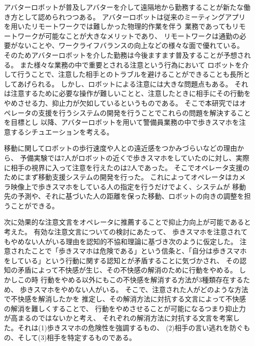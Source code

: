 \documentclass{kuisthesis}
\date{2024年1月31日}
\begin{document}
\maketitle

\begin{jabstract}


アバターロボットが普及しアバターを介して遠隔地から勤務することが新たな働き方として認められつつある。
アバターロボットは従来のミーティングアプリを用いたリモートワークでは難しかった物理的作業を伴う
業務であってもリモートワークが可能なことが大きなメリットであり、
リモートワークは通勤の必要がないことや、ワークライフバランスの向上などの様々な面で優れている。
そのためアバターロボットを介した勤務は今後ますます普及することが予想される。
また様々な業務の中で重要とされる注意という行為において
ロボットを介して行うことで、注意した相手とのトラブルを避けることができることも長所としてあげられる。
しかし、ロボットによる注意には大きな問題点もある。
それは注意するために必要な操作が難しいことと、注意したときに相手にその行動をやめさせる力、抑止力が欠如しているというものである。
そこで本研究ではオペレータの支援を行うシステムの開発を行うことでこれらの問題を解決することを目標とし
以降、アバターロボットを用いて警備員業務の中で歩きスマホを注意するシチュエーションを考える。

移動に関してロボットの歩行速度や人との遠近感をつかみづらいなどの理由から、
予備実験では7人がロボットの近くで歩きスマホをしていたのに対し、実際に相手の視界に入って注意を行えたのは2人であった。
そこでオペレータ支援のためにまず移動支援システムの開発を行った。
これによってオペレータはカメラ映像上で歩きスマホをしている人の指定を行うだけでよく、システムが
移動先の予測や、それに基づいた人の距離を保った移動、ロボットの向きの調整を担うことができる。

次に効果的な注意文言をオペレータに推薦することで抑止力向上が可能であると考えた。
有効な注意文言についての検討にあたって、
歩きスマホを注意されてもやめない人がいる理由を認知的不協和理論に基づき次のように仮定した。
注意されたことで「歩きスマホは危険である」という信条と、「自分は歩きスマホをしている」という行動に関する認知とが矛盾することに気づかされ、
その認知の矛盾によって不快感が生じ、その不快感の解消のために行動をやめる。
しかしこの時
行動をやめる以外にもこの不快感を解消する方法が3種類存在するため、
歩きスマホをやめない人がいる。
そこで、注意された人がどのような方法で不快感を解消したかを
推定し、その解消方法に対抗する文言によって不快感の解消を難しくすることで、
行動をやめさせることが可能になるつまり抑止力が高まるのではないかと考え、
それぞれの解消方法に対抗する文言を考案した。それは(1)歩きスマホの危険性を強調するもの、
(2)相手の言い逃れを防ぐもの、そして(3)相手を特定するものである。


\end{jabstract}
\end{document}

